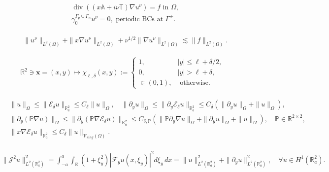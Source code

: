 \documentclass[10pt,a4paper]{amsart}
\renewcommand{\vec}[1]{\mathbf{#1}}
\begin{document}
\begin{align}
	\label{eq:unu_orig}
	\begin{split}
		& \operatorname{div}(( x \mathbb{A}+i\nu\mathbb{T})\nabla u^{\nu})=f \text{ in }\Omega, \\
		&\gamma_0^{\Gamma_p\cup\Gamma_n}u^{\nu}=0, \text{ periodic BCs at }\Gamma^{\pm}.
	\end{split}
	\tag{P$\nu$}
\end{align}

\begin{align}
	\label{eq:est_main_v2}
	&\|u^{\nu}\|_{L^2(\Omega)}+\|x\nabla u^{\nu}\|_{L^2(\Omega)}+\nu^{1/2}\|\nabla u^{\nu}\|_{L^2(\Omega)}\lesssim \|f\|_{L^2(\Omega)}.
\end{align}

\begin{align}
	\label{eq:childelta}
	\mathbb{R}^2\ni \vec{x}=(x,y)\mapsto	\chi_{\ell,\delta}(x,y):=\left\{
	\begin{array}{ll}
		1, & |y|\leq \ell+\delta/2, \\
		0,& |y|>\ell+\delta, \\
		\in (0,1), & \text{ otherwise. }
	\end{array}	\right.
\end{align}

\begin{align}
	\label{eq:important_mappings}
	\begin{split}
		&\|u\|_{\Omega}\leq \|\mathcal{E}_{\delta} u\|_{\mathbb{R}^2_a}\leq C_{\delta}\|u\|_{\Omega}, \quad \|\partial_y u\|_{\Omega}\leq \|\partial_y \mathcal{E}_{\delta} u\|_{\mathbb{R}^2_a}\leq C_{\delta}(\|\partial_y u\|_{\Omega}+\|u\|_{\Omega}),\\
		&\|\partial_y (\mathbb{P}\nabla u)\|_{\Omega}\leq \|\partial_y(\mathbb{P} \nabla\mathcal{E}_{\delta}u)\|_{\mathbb{R}^2_a}\leq C_{\delta,\mathbb{P}}( \|\mathbb{P}\partial_y\nabla u\|_{\Omega}+\|\partial_y u\|_{\Omega}+\|u\|_{\Omega}),\quad \mathbb{P}\in \mathbb{R}^{2\times 2},\\
		&\|x\nabla \mathcal{E}_{\delta}u\|_{\mathbb{R}^2_a}\leq C_{\delta} \|u\|_{\mathcal{V}_{sing}(\Omega)}.
	\end{split}
\end{align} 

\begin{align}
	\label{eq:Ju}
	\|\mathcal{J}^2 u\|^2_{L^2(\mathbb{R}^2_a)}=\int_{-a}^a\int_{\mathbb{R}}(1+\xi_y^2)|\mathcal{F}_yu(x,\xi_y)|^2d\xi_y\, dx=\|u\|^2_{L^2(\mathbb{R}^2_a)}+\|\partial_y u\|^2_{L^2(\mathbb{R}^2_a)},\quad \forall u\in H^1(\mathbb{R}^2_a).
\end{align}
\end{document}

